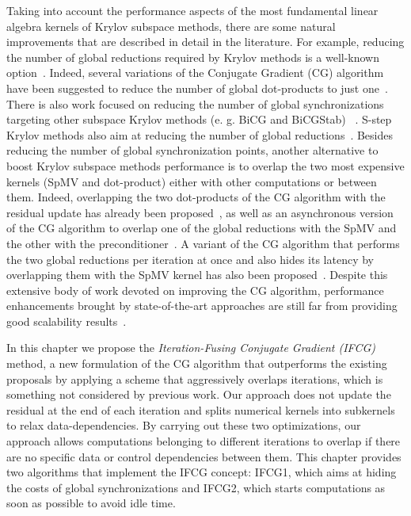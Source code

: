 Taking into account the performance aspects of the most fundamental linear algebra kernels of Krylov subspace methods, there are some natural improvements that are described in detail in the literature.
For example, reducing the number of global reductions required by Krylov methods is a well-known option~\cite{rosendale83, Barret94}. 
Indeed, several variations of the Conjugate Gradient (CG) algorithm have been suggested to reduce the number of global dot-products to just one~\cite{chronopoulos89, Saad84, Meurant87, Azevedo93}.
There is also work focused on reducing the number of global synchronizations targeting other subspace Krylov methods (e. g. BiCG and BiCGStab) ~\cite{Yang02, Yang02-1, ghysels13, chronopoulos91}. 
S-step Krylov methods also aim at reducing the number of global reductions~\cite{vorst95, newton95, wayne91, hoemmen}.  
Besides reducing the number of global synchronization points, another alternative to boost Krylov subspace methods performance is to overlap the two most expensive kernels (SpMV and dot-product) either with other computations or between them.
Indeed, overlapping the two dot-products of the CG algorithm with the residual update has already 
been proposed~\cite{Demmel93}, as well as an asynchronous version of the CG algorithm to overlap one of the global reductions with the SpMV and the other with the preconditioner~\cite{gropp10}. 
A variant of the CG algorithm that performs the two global reductions per iteration at once and also hides its latency by overlapping them with the SpMV kernel has also been proposed~\cite{ghysels14}.
Despite this extensive body of work devoted on improving the CG algorithm, performance enhancements brought by state-of-the-art approaches are still far from providing good scalability results~\cite{ghysels14}. 

In this chapter we propose the \emph{Iteration-Fusing Conjugate Gradient (IFCG)} method, a new formulation of the CG algorithm that outperforms the existing proposals by applying a scheme that aggressively overlaps iterations, which is something not considered by previous work. 
Our approach 
does not update the residual at the end of each iteration and splits numerical kernels into subkernels to relax data-dependencies.
By carrying out these two optimizations, our approach allows computations belonging to different iterations to overlap if there are no specific data or control dependencies between them.
This chapter provides two algorithms that implement the IFCG concept: 
IFCG1, which aims at hiding the costs of global synchronizations and IFCG2, which starts computations as soon as possible to avoid idle time. 


